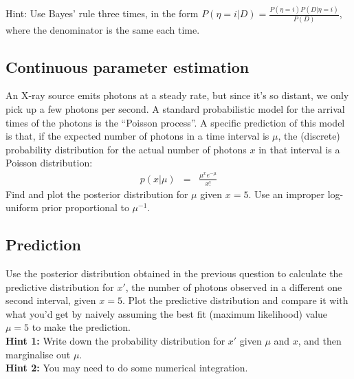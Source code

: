 \documentclass[a4paper, 11pt]{article}
\begin{document}
{\tiny Hint: Use Bayes' rule three times, in the form
$P(\eta = i | D) = \frac{P(\eta=i)P(D|\eta=i)}{P(D)}$, where the denominator is
the same each time.}

\subsection{Continuous parameter estimation}
An X-ray source emits photons at a steady rate, but since it's so distant, we
only pick up a few photons per second.
A standard probabilistic model for the arrival times of the photons is the
``Poisson process''. A specific prediction of this model is that, if the
expected number of photons in a time interval
is $\mu$, the (discrete) probability distribution for the actual number of photons $x$ in that interval is a Poisson distribution:
\begin{eqnarray}
p(x | \mu) &=& \frac{\mu^x e^{-\mu}}{x!}
\end{eqnarray}
Find and plot the posterior distribution for $\mu$ given $x=5$. Use an improper
log-uniform prior proportional to $\mu^{-1}$.

\subsection{Prediction}
Use the posterior distribution obtained in the previous question to calculate
the predictive distribution for $x'$, the number of photons observed in a
different one second interval, given $x=5$. Plot the predictive distribution
and compare it with what you'd get by naively assuming the best fit
(maximum likelihood) value $\mu=5$ to make the prediction.\\

{\bf Hint 1: }Write down the probability distribution for $x'$ given
$\mu$ and $x$, and then marginalise out $\mu$.\\

{\bf Hint 2: }You may need to do some numerical integration.
\end{document}
